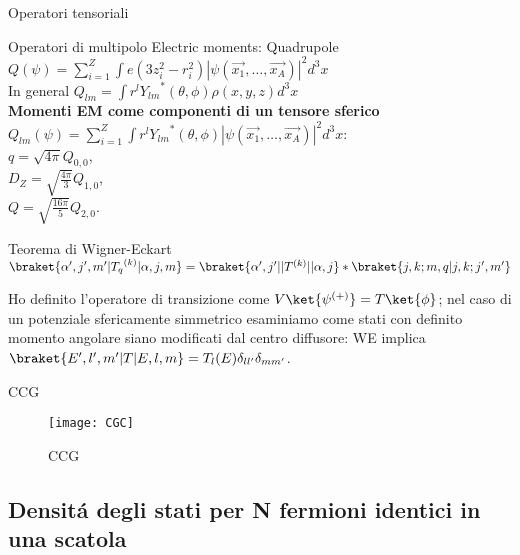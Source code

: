\begin{frame}{Operatori tensoriali}

\begin{block}{Operatori di multipolo}
    Electric moments: Quadrupole\\
$Q(\psi)=\sum_{i=1}^Z\int e(3z_i^2-r_i^2)|\psi(\vec{x_1},\ldots,\vec{x_A})|^2d^3x$\\
In general $Q_{lm}=\int r^l{Y_{lm}}^*(\theta,\phi)\rho(x,y,z)d^3x$\\
\textbf{Momenti EM come componenti di un tensore sferico}\\
$Q_{lm}(\psi)=\sum_{i=1}^Z\int r^l{Y_{lm}}^*(\theta,\phi)|\psi(\vec{x_1},\ldots,\vec{x_A})|^2d^3x$:\\ $q=\sqrt{4\pi}Q_{0,0}$,\\ 
$D_Z=\sqrt{\frac{4\pi}{3}}Q_{1,0}$,\\
$Q=\sqrt{\frac{16\pi}{5}}Q_{2,0}$.
\end{block}

\begin{block}{Teorema di Wigner-Eckart}
$\braket{\alpha',j',m'|{T_q}^{(k)}|\alpha,j,m}=\braket{\alpha',j'||T^{(k)}||\alpha,j}*\braket{j,k;m,q|j,k;j',m'}$
    
\end{block}

Ho definito l'operatore di transizione come $V\ket{\psi^{(+)}}=T\ket{\phi}$; nel caso di un potenziale sfericamente simmetrico esaminiamo come stati con definito momento angolare siano modificati dal centro diffusore: WE implica $\braket{E',l',m'|T|E,l,m}=T_l(E)\delta_{ll'}\delta_{mm'}$.

\end{frame}

\begin{frame}{CCG}
    \begin{figure}
    \centering
\texttt{[image: CGC]}
    \caption{CCG}
    \label{fig:CCG}
\end{figure}
\end{frame}

\subsection{Densit\'a degli stati per N fermioni identici in una scatola}

